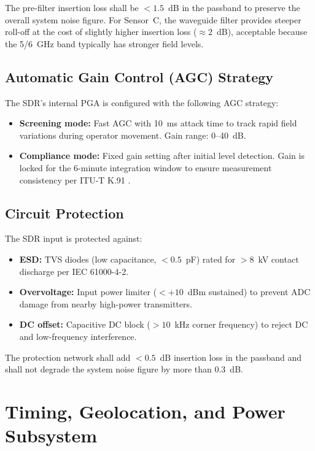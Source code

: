 \documentclass[11pt,a4paper]{article}
\begin{document}
\noindent The pre-filter insertion loss shall be $< 1.5$~dB in the passband to preserve the overall system noise figure. For Sensor~C, the waveguide filter provides steeper roll-off at the cost of slightly higher insertion loss ($\approx 2$~dB), acceptable because the 5/6~GHz band typically has stronger field levels.

\subsection{Automatic Gain Control (AGC) Strategy}

The SDR's internal PGA is configured with the following AGC strategy:

\begin{itemize}
    \item \textbf{Screening mode:} Fast AGC with 10~ms attack time to track rapid field variations during operator movement. Gain range: 0--40~dB.
    \item \textbf{Compliance mode:} Fixed gain setting after initial level detection. Gain is locked for the 6-minute integration window to ensure measurement consistency per ITU-T K.91 \cite{itut_k91}.
\end{itemize}

\subsection{Circuit Protection}

The SDR input is protected against:

\begin{itemize}
    \item \textbf{ESD:} TVS diodes (low capacitance, $< 0.5$~pF) rated for $> 8$~kV contact discharge per IEC 61000-4-2.
    \item \textbf{Overvoltage:} Input power limiter ($< +10$~dBm sustained) to prevent ADC damage from nearby high-power transmitters.
    \item \textbf{DC offset:} Capacitive DC block ($> 10$~kHz corner frequency) to reject DC and low-frequency interference.
\end{itemize}

\noindent The protection network shall add $< 0.5$~dB insertion loss in the passband and shall not degrade the system noise figure by more than 0.3~dB.

\section{Timing, Geolocation, and Power Subsystem}
\label{sec:auxiliary_subsystems}
\end{document}
